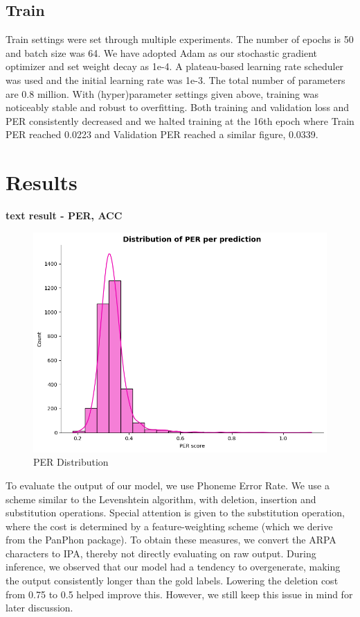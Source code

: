\documentclass[11pt]{article}
\begin{document}
{\subsection{Train}
Train settings were set through multiple experiments. The number of epochs is 50 and batch size was 64. We have adopted Adam as our stochastic gradient optimizer and set weight decay as 1e-4. A plateau-based learning rate scheduler was used and the initial learning rate was 1e-3. The total number of parameters are 0.8 million. With (hyper)parameter settings given above, training was noticeably stable and robust to overfitting. Both training and validation loss and PER consistently decreased and we halted training at the 16th epoch where Train PER reached 0.0223 and Validation PER reached a similar figure, 0.0339.

\section{Results}

\textbf{text result - PER, ACC}
\begin{figure}
    \centering
    \includegraphics[width=0.75\linewidth]{model_per_distribution.png}
    \caption{PER Distribution}
    \label{fig:placeholder}
\end{figure}

To evaluate the output of our model, we use Phoneme Error Rate. We use a scheme similar to the Levenshtein algorithm, with deletion, insertion and substitution operations. Special attention is given to the substitution operation, where the cost is determined by a feature-weighting scheme (which we derive from the PanPhon package). To obtain these measures, we convert the ARPA characters to IPA, thereby not directly evaluating on raw output. During inference, we observed that our model had a tendency to overgenerate, making the output consistently longer than the gold labels. Lowering the deletion cost from 0.75 to 0.5 helped improve this. However, we still keep this issue in mind for later discussion.

}
\end{document}
